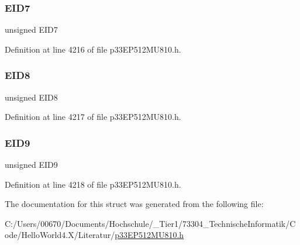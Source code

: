 \subsubsection{\texorpdfstring{E\+I\+D7}{EID7}}
{\footnotesize\ttfamily unsigned E\+I\+D7}



Definition at line 4216 of file p33\+E\+P512\+M\+U810.\+h.

\mbox{\label{structtag_c1_r_x_f8_e_i_d_b_i_t_s_acca25e0b7d86eb499d01f85222baea87}} 
\subsubsection{\texorpdfstring{E\+I\+D8}{EID8}}
{\footnotesize\ttfamily unsigned E\+I\+D8}



Definition at line 4217 of file p33\+E\+P512\+M\+U810.\+h.

\mbox{\label{structtag_c1_r_x_f8_e_i_d_b_i_t_s_ac6748f73d4ada8538b06548be4f396c2}} 
\subsubsection{\texorpdfstring{E\+I\+D9}{EID9}}
{\footnotesize\ttfamily unsigned E\+I\+D9}



Definition at line 4218 of file p33\+E\+P512\+M\+U810.\+h.



The documentation for this struct was generated from the following file\+:\begin{DoxyCompactItemize}
\item 
C\+:/\+Users/00670/\+Documents/\+Hochschule/\+\_\+\+Tier1/73304\+\_\+\+Technische\+Informatik/\+Code/\+Hello\+World4.\+X/\+Literatur/\hyperlink{p33_e_p512_m_u810_8h}{p33\+E\+P512\+M\+U810.\+h}\end{DoxyCompactItemize}
